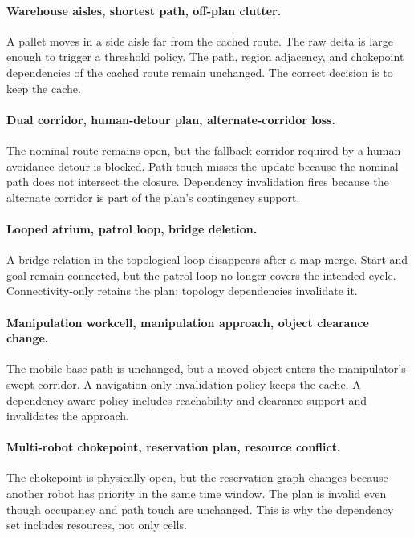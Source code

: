 \documentclass{article}
\begin{document}
\paragraph{Warehouse aisles, shortest path, off-plan clutter.}
A pallet moves in a side aisle far from the cached route. The raw delta is large enough to trigger a threshold policy. The path, region adjacency, and chokepoint dependencies of the cached route remain unchanged. The correct decision is to keep the cache.

\paragraph{Dual corridor, human-detour plan, alternate-corridor loss.}
The nominal route remains open, but the fallback corridor required by a human-avoidance detour is blocked. Path touch misses the update because the nominal path does not intersect the closure. Dependency invalidation fires because the alternate corridor is part of the plan's contingency support.

\paragraph{Looped atrium, patrol loop, bridge deletion.}
A bridge relation in the topological loop disappears after a map merge. Start and goal remain connected, but the patrol loop no longer covers the intended cycle. Connectivity-only retains the plan; topology dependencies invalidate it.

\paragraph{Manipulation workcell, manipulation approach, object clearance change.}
The mobile base path is unchanged, but a moved object enters the manipulator's swept corridor. A navigation-only invalidation policy keeps the cache. A dependency-aware policy includes reachability and clearance support and invalidates the approach.

\paragraph{Multi-robot chokepoint, reservation plan, resource conflict.}
The chokepoint is physically open, but the reservation graph changes because another robot has priority in the same time window. The plan is invalid even though occupancy and path touch are unchanged. This is why the dependency set includes resources, not only cells.
\end{document}
